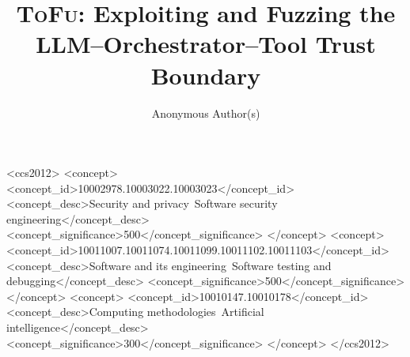 \documentclass[acmsmall,screen,review,anonymous]{acmart}
\newcommand{\project}{\textsc{ToFu}\xspace}
\begin{document}

\title{\project: Exploiting and Fuzzing the LLM--Orchestrator--Tool Trust
  Boundary}

\author{Anonymous Author(s)}



\begin{CCSXML}
<ccs2012>
   <concept>
       <concept_id>10002978.10003022.10003023</concept_id>
       <concept_desc>Security and privacy~Software security engineering</concept_desc>
       <concept_significance>500</concept_significance>
   </concept>
   <concept>
       <concept_id>10011007.10011074.10011099.10011102.10011103</concept_id>
       <concept_desc>Software and its engineering~Software testing and debugging</concept_desc>
       <concept_significance>500</concept_significance>
   </concept>
   <concept>
       <concept_id>10010147.10010178</concept_id>
       <concept_desc>Computing methodologies~Artificial intelligence</concept_desc>
       <concept_significance>300</concept_significance>
   </concept>
</ccs2012>
\end{CCSXML}



\maketitle














\end{document}
